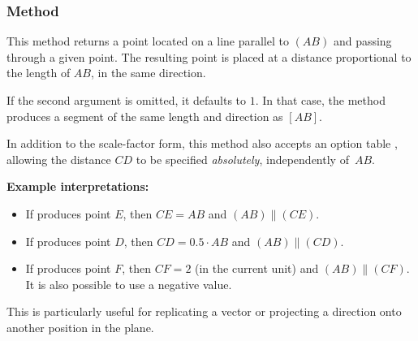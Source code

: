 \subsubsection{Method } %
\label{ssub:method_line_collinear__at}

This method returns a point located on a line parallel to $(AB)$ and passing through a given point.
The resulting point is placed at a distance proportional to the length of $AB$, in the same direction.

\medskip

If the second argument  is omitted, it defaults to $1$.
In that case, the method produces a segment of the same length and direction as $[AB]$.

\medskip

In addition to the scale-factor form, this method also accepts an option table
, allowing the distance $CD$ to be specified
\emph{absolutely}, independently of~$AB$.

\medskip

\textbf{Example interpretations:}
\begin{itemize}
  \item If  produces point $E$, then $CE = AB$ and $(AB) \parallel (CE)$.
  \item If  produces point $D$, then $CD = 0.5 \cdot AB$ and $(AB) \parallel (CD)$.
  \item If  produces point $F$, then $CF = 2$ (in the current unit) and $(AB) \parallel (CF)$. It is also possible to use a negative value.
\end{itemize}

This is particularly useful for replicating a vector or projecting a direction onto another position in the plane.

\vspace{1em}
\begin{tkzexample}[latex =.5\textwidth]
\begin{center}
\end{center}
\end{tkzexample}


